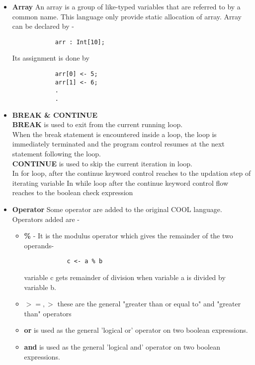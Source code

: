 \documentclass[11pt]{article}
\begin{document}
\begin{enumerate}
\begin{itemize}
        \item \textbf{Array} An array is a group of like-typed variables that are referred to by a common name. This language only provide static allocation of array. Array can be declared by - 
        \begin{verbatim}
            arr : Int[10];
        \end{verbatim}
        \vspace{-0.5cm}
        Its assignment is done by 
        \begin{verbatim}
            arr[0] <- 5;
            arr[1] <- 6;
            .
            .
        \end{verbatim}
        \vspace{-0.5cm}
        
        \item \textbf{BREAK \& CONTINUE}\\
        
        \textbf{BREAK} is used to exit from the current running loop.\\ When the break statement is encountered inside a loop, the loop is immediately terminated and the program control resumes at the next statement following the loop.\\
        
        \textbf{CONTINUE} is used to skip the current iteration in loop. \\
        In for loop, after the continue keyword control reaches to the updation step of iterating variable
        In while loop after the continue keyword control flow reaches to the boolean check expression
        
        \item \textbf{Operator}
        Some operator are added to the original COOL language. Operators added are -
        \begin{itemize}
            \item \textbf{\%} - It is the modulus operator which gives the remainder of the two operands-
            \begin{verbatim}
            c <- a % b
            \end{verbatim}
            \vspace{-0.5cm}
            variable c gets remainder of division when variable a is divided by variable b.
            
            \item \textbf{$>=,>$} these are the general "greater than or equal to" and "greater than" operators
            \item \textbf{or} is used as the general 'logical or' operator on two boolean expressions.
            \item \textbf{and} is used as the general 'logical and' operator on two boolean expressions.
        \end{itemize}
        

\end{itemize}
\end{enumerate}
\end{document}
